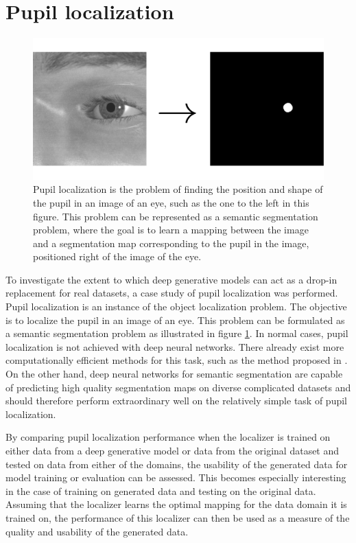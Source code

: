 \section{Pupil localization}
\begin{figure}[t]
    \centering
    \includegraphics[width=\textwidth]{images/misc/pupil-localization.pdf}
    \caption{Pupil localization is the problem of finding the position and shape of the pupil in an image of an eye, such as the one to the left in this figure. This problem can be represented as a semantic segmentation problem, where the goal is to learn a mapping between the image and a segmentation map corresponding to the pupil in the image, positioned right of the image of the eye.}
    \label{fig:pupillocalization}
\end{figure}
To investigate the extent to which deep generative models can act as a drop-in replacement for real datasets, a case study of pupil localization was performed. Pupil localization is an instance of the object localization problem. The objective is to localize the pupil in an image of an eye. This problem can be formulated as a semantic segmentation problem as illustrated in figure \ref{fig:pupillocalization}. In normal cases, pupil localization is not achieved with deep neural networks. There already exist more computationally efficient methods for this task, such as the method proposed in \parencite{markuvs2014eye}. On the other hand, deep neural networks for semantic segmentation are capable of predicting high quality segmentation maps on diverse complicated datasets \parencite{ChenPK0Y16semantic} and should therefore perform extraordinary well on the relatively simple task of pupil localization.

By comparing pupil localization performance when the localizer is trained on either data from a deep generative model or data from the original dataset and tested on data from either of the domains, the usability of the generated data for model training or evaluation can be assessed. This becomes especially interesting in the case of training on generated data and testing on the original data. Assuming that the localizer learns the optimal mapping for the data domain it is trained on, the performance of this localizer can then be used as a measure of the quality and usability of the generated data. 

